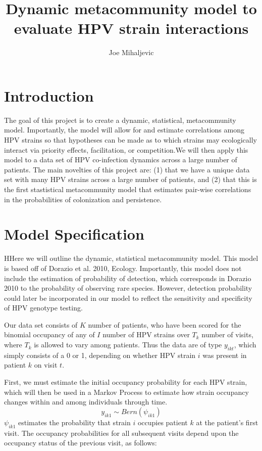 \documentclass{article}
\title{Dynamic metacommunity model to evaluate HPV strain interactions}
\author{Joe Mihaljevic}
\begin{document}

\maketitle

\section*{Introduction}

The goal of this project is to create a dynamic, statistical, metacommunity model. Importantly, the model will allow for and estimate correlations among HPV strains so that hypotheses can be made as to which strains may ecologically interact via priority effects, facilitation, or competition.We will then apply this model to a data set of HPV co-infection dynamics across a large number of patients. The main novelties of this project are: (1) that we have a unique data set with many HPV strains across a large number of patients, and (2) that this is the first stastistical metacommunity model that estimates pair-wise correlations in the probabilities of colonization and persistence.

\section*{Model Specification}

HHere we will outline the dynamic, statistical metacommunity model. This model is based off of Dorazio et al. 2010, Ecology. Importantly, this model does not include the estimation of probability of detection, which corresponds in Dorazio 2010 to the probability of observing rare species. However, detection probability could later be incorporated in our model to reflect the sensitivity and specificity of HPV genotype testing.

Our data set consists of $K$ number of patients, who have been scored for the binomial occupancy of any of $I$ number of HPV strains over $T_{k}$ number of visits, where $T_{k}$ is allowed to vary among patients. Thus the data are of type $y_{ikt}$, which simply consists of a 0 or 1, depending on whether HPV strain $i$ was present in patient $k$ on visit $t$. 

First, we must estimate the initial occupancy probability for each HPV strain, which will then be used in a Markov Process to estimate how strain occupancy changes within and among individuals through time. 
$$y_{ik1} \sim Bern(\psi_{ik1})$$
$\psi_{ik1}$ estimates the probability that strain $i$ occupies patient $k$ at the patient's first visit. The occupancy probabilities for all subsequent visits depend upon the occupancy status of the previous visit, as follows:
\end{document}

